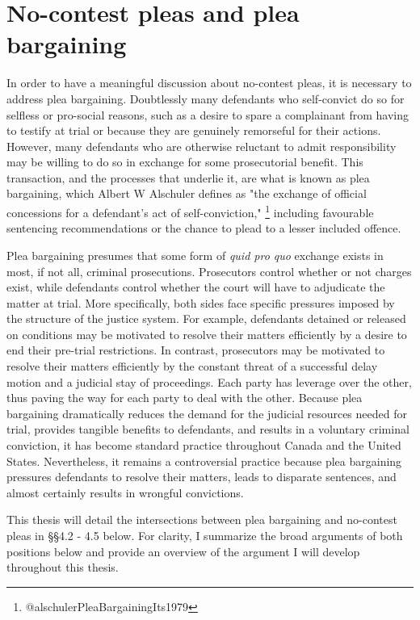 \section{No-contest pleas and plea bargaining}

In order to have a meaningful discussion about no-contest pleas, it is necessary to address plea bargaining. Doubtlessly many defendants who self-convict do so for selfless or pro-social reasons, such as a desire to spare a complainant from having to testify at trial or because they are genuinely remorseful for their actions. However, many defendants who are otherwise reluctant to admit responsibility may be willing to do so in exchange for some prosecutorial benefit. This transaction, and the processes that underlie it, are what is known as plea bargaining, which Albert W Alschuler defines as "the exchange of official concessions for a defendant's act of self-conviction," \footnote{@alschulerPleaBargainingIts1979} including favourable sentencing recommendations or the chance to plead to a lesser included offence. 

Plea bargaining presumes that some form of \textit{quid pro quo} exchange exists in most, if not all, criminal prosecutions. Prosecutors control whether or not charges exist, while defendants control whether the court will have to adjudicate the matter at trial. More specifically, both sides face specific pressures imposed by the structure of the justice system. For example, defendants detained or released on conditions may be motivated to resolve their matters efficiently by a desire to end their pre-trial restrictions. In contrast, prosecutors may be motivated to resolve their matters efficiently by the constant threat of a successful delay motion and a judicial stay of proceedings. Each party has leverage over the other, thus paving the way for each party to deal with the other. Because plea bargaining dramatically reduces the demand for the judicial resources needed for trial, provides tangible benefits to defendants, and results in a voluntary criminal conviction, it has become standard practice throughout Canada and the United States. Nevertheless, it remains a controversial practice because plea bargaining pressures defendants to resolve their matters, leads to disparate sentences, and almost certainly results in wrongful convictions.

This thesis will detail the intersections between plea bargaining and no-contest pleas in §§4.2 - 4.5 below. For clarity, I summarize the broad arguments of both positions below and provide an overview of the argument I will develop throughout this thesis.

